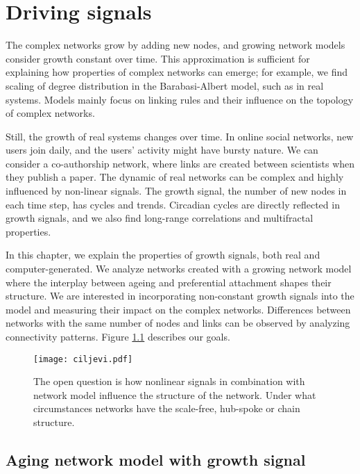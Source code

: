 
\chapter{Driving signals} %
\label{Ch:signals} %

The complex networks grow by adding new nodes, and growing network models consider growth constant over time. This approximation is sufficient for explaining how properties of complex networks can emerge; for example, we find scaling of degree distribution in the Barabasi-Albert model, such as in real systems. Models mainly focus on linking rules and their influence on the topology of complex networks. 

Still, the growth of real systems changes over time. In online social networks, new users join daily, and the users' activity might have bursty nature. We can consider a co-authorship network, where links are created between scientists when they publish a paper. The dynamic of real networks can be complex and highly influenced by non-linear signals. The growth signal, the number of new nodes in each time step, has cycles and trends. Circadian cycles are directly reflected in growth signals, and we also find long-range correlations and multifractal properties. 

In this chapter, we explain the properties of growth signals, both real and computer-generated. We analyze networks created with a growing network model where the interplay between ageing and preferential attachment shapes their structure. We are interested in incorporating non-constant growth signals into the model and measuring their impact on the complex networks. Differences between networks with the same number of nodes and links can be observed by analyzing connectivity patterns. Figure \ref{fig:ciljevi} describes our goals. 

\begin{figure}[!ht]
	\centering
	\texttt{[image: ciljevi.pdf]}
	\caption[Nonlinear growth of network.]{The open question is how nonlinear signals in combination with network model influence the structure of the network. Under what circumstances networks have the scale-free, hub-spoke or chain structure. }
	\label{fig:ciljevi}
\end{figure}

\section{Aging network model with growth signal}

